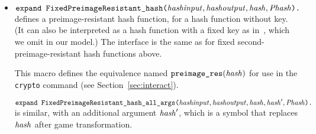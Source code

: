 \documentclass{article}
\begin{document}
\begin{itemize}
\item $\texttt{expand FixedPreimageResistant\_hash(}\mathit{hashinput}, \mathit{hashoutput}, \mathit{hash}, \mathit{Phash}\texttt{).}$
defines a preimage-resistant hash function, for a hash function without key. (It can also be interpreted as a hash function with a fixed key as in~\cite{Rogaway04}, which we omit in our model.)
The interface is the same as for fixed second-preimage-resistant hash functions above.

   This macro defines the equivalence named
   $\texttt{preimage\_res}(\mathit{hash})$ for use in the
   \texttt{crypto} command (see Section~\ref{sec:interact}).

$\texttt{expand FixedPreimageResistant\_hash\_all\_args(}\mathit{hashinput}, \mathit{hashoutput}, \mathit{hash}, \mathit{hash}', \mathit{Phash}\texttt{).}$ is similar, with an additional argument $\mathit{hash}'$, which is a symbol that replaces $\mathit{hash}$ after game transformation.


\end{itemize}
\end{document}
